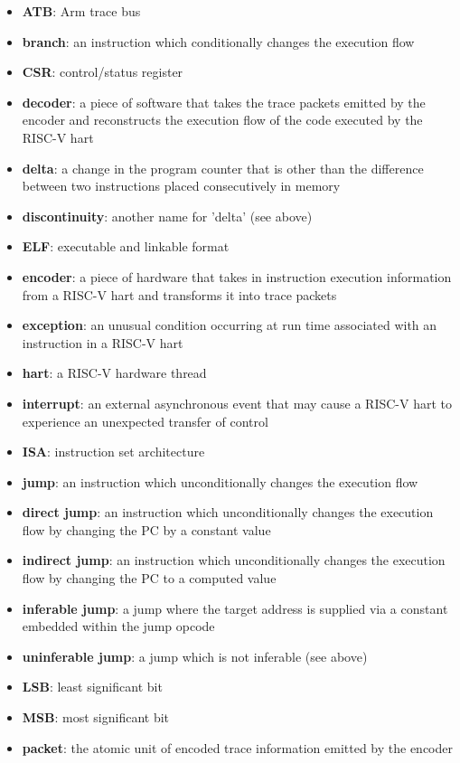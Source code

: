 \begin{itemize}
  \item \textbf{ATB}: Arm trace bus
  \item \textbf{branch}: an instruction which conditionally changes the execution flow
  \item \textbf{CSR}: control/status register
  \item \textbf{decoder}: a piece of software that takes the trace packets emitted by the encoder and 
    reconstructs the execution flow of the code executed by the RISC-V hart
  \item \textbf{delta}: a change in the program counter that is other than the difference between two instructions placed consecutively in memory
  \item \textbf{discontinuity}: another name for 'delta' (see above)
  \item \textbf{ELF}: executable and linkable format
  \item \textbf{encoder}: a piece of hardware that takes in instruction execution information from a RISC-V hart and transforms it into trace packets
  \item \textbf{exception}: an unusual condition occurring at run time associated with an instruction in a RISC-V hart
  \item \textbf{hart}: a RISC-V hardware thread
  \item \textbf{interrupt}: an external asynchronous event that may cause a RISC-V hart to experience an unexpected transfer of control
  \item \textbf{ISA}: instruction set architecture
  \item \textbf{jump}: an instruction which unconditionally changes the execution flow
  \item \textbf{direct jump}: an instruction which unconditionally changes the execution flow by changing the PC by a constant value
  \item \textbf{indirect jump}: an instruction which unconditionally changes the execution flow by changing the PC to a computed value
  \item \textbf{inferable jump}: a jump where the target address is supplied via a constant embedded within the jump opcode
  \item \textbf{uninferable jump}: a jump which is not inferable (see above)
  \item \textbf{LSB}: least significant bit
  \item \textbf{MSB}: most significant bit
  \item \textbf{packet}: the atomic unit of encoded trace information emitted by the encoder

\end{itemize}
